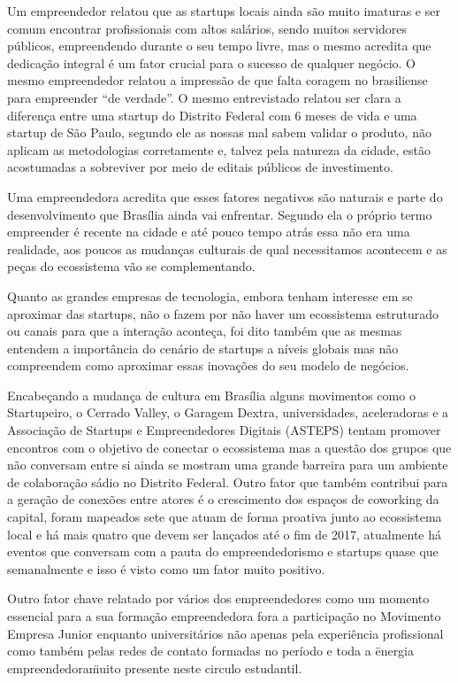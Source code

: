 Um empreendedor relatou que as startups locais ainda são muito imaturas e ser comum encontrar profissionais com altos salários, sendo muitos servidores públicos, empreendendo durante o seu tempo livre, mas o mesmo acredita que dedicação integral é um fator crucial para o sucesso de qualquer negócio. O mesmo empreendedor relatou a impressão de que falta coragem no brasiliense para empreender ``de verdade''. O mesmo entrevistado relatou ser clara a diferença entre uma startup do Distrito Federal com 6 meses de vida e uma startup de São Paulo, segundo ele as nossas mal sabem validar o produto, não aplicam as metodologias corretamente e, talvez pela natureza da cidade, estão acostumadas a sobreviver por meio de editais públicos de investimento.

Uma empreendedora acredita que esses fatores negativos são naturais e parte do desenvolvimento que Brasília ainda vai enfrentar. Segundo ela o próprio termo empreender é recente na cidade e até pouco tempo atrás essa não era uma realidade, aos poucos as mudanças culturais de qual necessitamos acontecem e as peças do ecossistema vão se complementando.

Quanto as grandes empresas de tecnologia, embora tenham interesse em se aproximar das startups, não o fazem por não haver um ecossistema estruturado ou canais para que a interação aconteça, foi dito também que as mesmas entendem a importância do cenário de startups a níveis globais mas não compreendem como aproximar essas inovações do seu modelo de negócios.

Encabeçando a mudança de cultura em Brasília alguns movimentos como o Startupeiro, o Cerrado Valley, o Garagem Dextra, universidades, aceleradoras e a Associação de Startups e Empreendedores Digitais (ASTEPS) tentam promover encontros com o objetivo de conectar o ecossistema mas a questão dos grupos que não conversam entre si ainda se mostram uma grande barreira para um ambiente de colaboração sádio no Distrito Federal. Outro fator que também contribui para a geração de conexões entre atores é o crescimento dos espaços de coworking da capital, foram mapeados sete que atuam de forma proativa junto ao ecossistema local e há mais quatro que devem ser lançados até o fim de 2017, atualmente há eventos que conversam com a pauta do empreendedorismo e startups quase que semanalmente e isso é visto como um fator muito positivo. 

Outro fator chave relatado por vários dos empreendedores como um momento essencial para a sua formação empreendedora fora a participação no Movimento Empresa Junior enquanto universitários não apenas pela experiência profissional como também pelas redes de contato formadas no período e toda a \"energia empreendedora\" muito presente neste circulo estudantil. 

